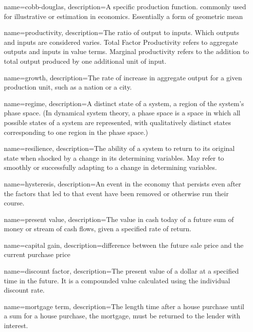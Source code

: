 {
name=cobb-douglas,
description={A specific production function. commonly used for illustrative or estimation in economics. Essentially a form of geometric mean}
}

{
name=productivity,
description={The ratio of output to inputs. Which outputs and inputs are considered varies. Total Factor Productivity refers to aggregate outputs and inputs in value terms. Marginal productivity refers to the addition to total output produced by one additional unit of input.} 
}

{
name=growth,
description={The rate of increase in aggregate output for a given production unit, such as a nation  or a city.}
}

{
name=regime,
description={A distinct state of a system, a region of the system's phase space. (In dynamical system theory, a phase space is a space in which all possible states of a system are represented, with qualitatively distinct  states corresponding to one region in the phase space.)}
}

{
name=resilience,
description={The ability of a system to return to its original state when shocked by a change in its determining variables. May refer to smoothly or successfully adapting to a change in  determining variables. }
}

{
name=hysteresis,
description={An event in the economy that persists even after the factors that led to that event have been removed or otherwise run their course.}
}

{
name=present value,
description={The value in cash today of a future sum of money or stream of cash flows, given a specified rate of return.}
}

{
name=capital gain,
description={difference between the future sale price and the current purchase price}
}

{
name=discount factor,
description={The present value of a dollar at a specified time in the future. It is a compounded value calculated using the individual discount rate.}
}

{
name=mortgage term,
description={The length time after a house purchase until a sum for a house purchase, the mortgage, must be returned to the lender with interest.}
}

